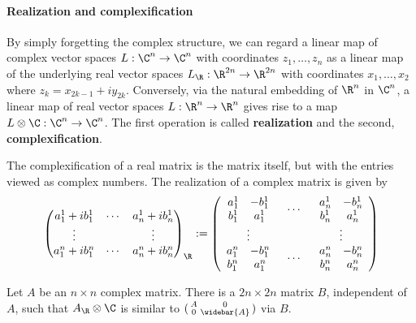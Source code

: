\paragraph{Realization and complexification}
By simply forgetting the complex structure, we can regard a linear map of complex vector spaces $L:\C^n\to\C^n$ with coordinates $z_1,\dots,z_n$ as a linear map of the 
underlying real vector spaces $L_{\R}:\R^{2n}\to\R^{2n}$ with coordinates $x_1,\dots,x_2$ where $z_k=x_{2k-1}+iy_{2k}$. Conversely, via the natural embedding of $\R^{n}$ 
in $\C^n$, a linear map of real vector spaces $L:\R^n\to\R^n$ gives rise to a map $L\otimes\C:\C^n\to\C^n$. The first operation is called \textbf{realization} and the 
second, \textbf{complexification}.\par
The complexification of a real matrix is the matrix itself, but with the entries viewed as complex numbers. The realization of a complex matrix is given by 
\[\begin{pmatrix}
a^1_1+ib^1_1&\cdots&a^1_n+ib^1_n\\
\vdots&&\vdots\\
a^n_1+ib^n_1&\cdots&a^n_n+ib^n_n
\end{pmatrix}_{\R}
:=\begin{pmatrix}
\begin{array}{cc}
a^1_1&-b^1_1\\
b^1_1&a^1_1
\end{array}&\cdots&\begin{array}{cc}
a^1_n&-b^1_n\\
b^1_n&a^1_n
\end{array}\\
\vdots&&\vdots\\
\begin{array}{cc}
a^n_1&-b^n_1\\
b^n_1&a^n_1
\end{array}&\cdots&\begin{array}{cc}
a^n_n&-b^n_n\\
b^n_n&a^n_n
\end{array}
\end{pmatrix}
\]
\begin{lemma}\label{complexification matrix}
Let $A$ be an $n\times n$ complex matrix. There is a $2n\times 2n$ matrix $B$, independent of $A$, such that $A_{\R}\otimes\C$ is similar to 
$(\begin{smallmatrix}
A&0\\
0&\widebar{A}
\end{smallmatrix})$ 
via $B$.
\end{lemma}
